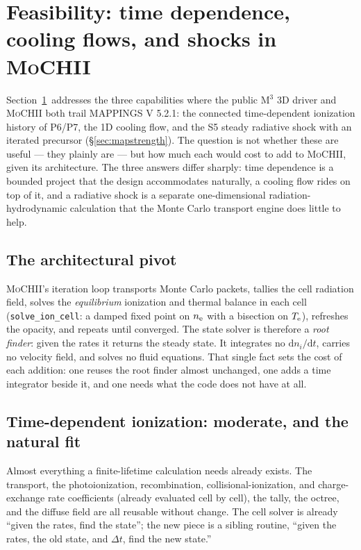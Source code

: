 \documentclass[english,a4paper]{my_memo}
\newcommand{\code}[1]{\texttt{#1}}
\newcommand{\MoCHII}{\textsc{MoCHII}}
\newcommand{\Mthree}{M$^3$}
\newcommand{\Mappings}{MAPPINGS V 5.2.1}
\newcommand{\Te}{T_{\rm e}}
\newcommand{\nelec}{n_{\rm e}}
\begin{document}
\section{Feasibility: time dependence, cooling flows, and shocks in
\texorpdfstring{\MoCHII{}}{MoCHII}}
\label{sec:tdcs}

Section~\ref{sec:tdcs}\ addresses the three capabilities where the public
\Mthree{} 3D driver and \MoCHII{} both trail \Mappings{}: the connected
time-dependent ionization history of P6/P7, the 1D cooling flow, and the
S5 steady radiative shock with an iterated precursor
(\S\ref{sec:mapstrength}).  The question is not whether these are useful
--- they plainly are --- but how much each would cost to add to
\MoCHII{}, given its architecture.  The three answers differ sharply:
time dependence is a bounded project that the design accommodates
naturally, a cooling flow rides on top of it, and a radiative shock is a
separate one-dimensional radiation-hydrodynamic calculation that the
Monte Carlo transport engine does little to help.

\subsection{The architectural pivot}

\MoCHII{}'s iteration loop transports Monte Carlo packets, tallies the
cell radiation field, solves the \emph{equilibrium} ionization and thermal
balance in each cell (\code{solve\_ion\_cell}: a damped fixed point on
$\nelec$ with a bisection on $\Te$), refreshes the opacity, and repeats
until converged.  The state solver is therefore a \emph{root finder}:
given the rates it returns the steady state.  It integrates no
$\mathrm{d}n_i/\mathrm{d}t$, carries no velocity field, and solves no
fluid equations.  That single fact sets the cost of each addition: one
reuses the root finder almost unchanged, one adds a time integrator
beside it, and one needs what the code does not have at all.

\subsection{Time-dependent ionization: moderate, and the natural fit}

Almost everything a finite-lifetime calculation needs already exists.  The
transport, the photoionization, recombination, collisional-ionization, and
charge-exchange rate coefficients (already evaluated cell by cell), the
tally, the octree, and the diffuse field are all reusable without change.
The cell solver is already ``given the rates, find the state''; the new
piece is a sibling routine, ``given the rates, the old state, and
$\Delta t$, find the new state.''
\end{document}
